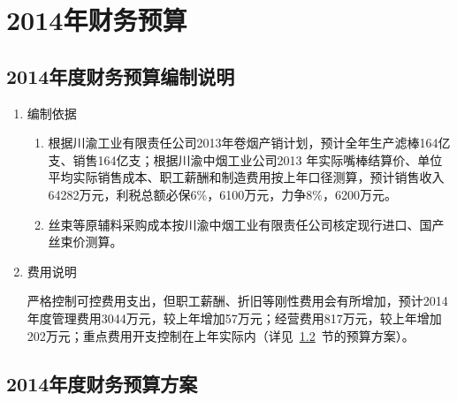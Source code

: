 ﻿\chapter{2014年财务预算}
\section{2014年度财务预算编制说明}

\renewcommand{\labelenumi}{\indent （\chinese{enumi}）}
\begin{enumerate}
\setlength{\itemindent}{1.3em} %
 \setlength{\topsep}{1ex} %
 \setlength{\itemsep}{0.5ex} %

\item 编制依据
  \begin{enumerate}[1、]
\item 根据川渝工业有限责任公司2013年卷烟产销计划，预计全年生产滤棒164亿支、销售164亿支；根据川渝中烟工业公司2013 年实际嘴棒结算价、单位平均实际销售成本、职工薪酬和制造费用按上年口径测算，预计销售收入64282万元，利税总额必保6\%，6100万元，力争8\%，6200万元。

\item 丝束等原辅料采购成本按川渝中烟工业有限责任公司核定现行进口、国产丝束价测算。
\end{enumerate}

\item 费用说明

严格控制可控费用支出，但职工薪酬、折旧等刚性费用会有所增加，预计2014年度管理费用3044万元，较上年增加57万元；经营费用817万元，较上年增加202万元；重点费用开支控制在上年实际内（详见~\ref{section:Budge}~节的预算方案）。
\end{enumerate}
\section{2014年度财务预算方案}\label{section:Budge}
